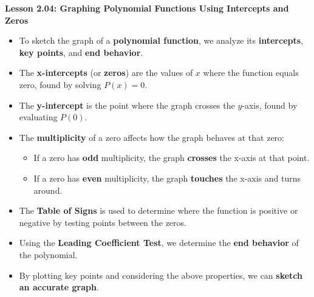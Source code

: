 \begin{center}
\textbf{Lesson 2.04: Graphing Polynomial Functions Using Intercepts and Zeros}
\end{center}

\vspace*{-1.5ex}

\begin{itemize}
    \item To sketch the graph of a \textbf{polynomial function}, we analyze its \textbf{intercepts}, \textbf{key points}, and \textbf{end behavior}.
    \item The \textbf{x-intercepts} (or \textbf{zeros}) are the values of \( x \) where the function equals zero, found by solving \( P(x) = 0 \).
    \item The \textbf{y-intercept} is the point where the graph crosses the \( y \)-axis, found by evaluating \( P(0) \).
    \item The \textbf{multiplicity} of a zero affects how the graph behaves at that zero:
    \begin{itemize}
        \item If a zero has \textbf{odd} multiplicity, the graph \textbf{crosses} the x-axis at that point.
        \item If a zero has \textbf{even} multiplicity, the graph \textbf{touches} the x-axis and turns around.
    \end{itemize}
    \item The \textbf{Table of Signs} is used to determine where the function is positive or negative by testing points between the zeros.
    \item Using the \textbf{Leading Coefficient Test}, we determine the \textbf{end behavior} of the polynomial.
    \item By plotting key points and considering the above properties, we can \textbf{sketch an accurate graph}.
\end{itemize}
